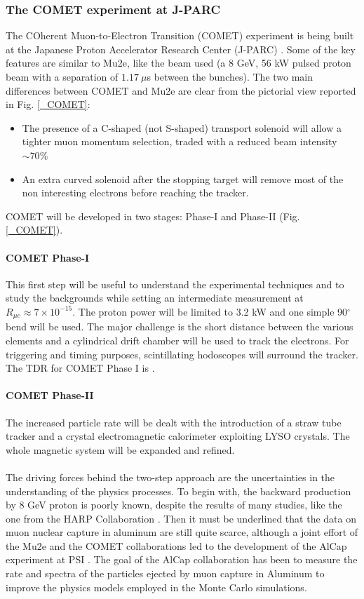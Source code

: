 \documentclass[12pt,a4paper,openright, oneside, titlepage]{book} %
\begin{document}
\subsubsection{The COMET experiment at J-PARC}
The COherent Muon-to-Electron Transition (COMET) experiment is being built at the Japanese Proton Accelerator Research Center (J-PARC) \cite{COMET_I}. 
Some of the key features are similar to Mu2e, like the beam used (a 8 GeV, 56 kW pulsed proton beam with a separation of $1.17\ \mu$s between the bunches). 
The two main differences between COMET and Mu2e are clear from the pictorial view reported in Fig. \ref{_COMET}:
\begin{itemize}
\item The presence of a C-shaped (not S-shaped) transport solenoid will allow a tighter muon momentum selection, traded with a reduced beam intensity $\sim 70\%$
\item An extra curved solenoid after the stopping target will remove most of the non interesting electrons before reaching the tracker.
\end{itemize}
COMET will be developed in two stages: Phase-I and Phase-II (Fig. \ref{_COMET}).
\paragraph{COMET Phase-I}
This first step will be useful to understand the experimental techniques and to study the backgrounds while setting an intermediate measurement at $R_{\mu e}\approx7\times10^{-15}$. 
The proton power will be limited to 3.2 kW and one simple 90$^\circ$ bend will be used. 
The major challenge is the short distance between the various elements and a cylindrical drift chamber will be used to track the electrons. For triggering and timing purposes, scintillating hodoscopes will surround the tracker. 
The TDR for COMET Phase I is \cite{COMET_I}.
\paragraph{COMET Phase-II}
The increased particle rate will be dealt with the introduction of a straw tube tracker and a crystal electromagnetic calorimeter exploiting LYSO crystals. 
The whole magnetic system will be expanded and refined.\\ \\
The driving forces behind the two-step approach are the uncertainties in the understanding of the physics processes. 
To begin with, the backward production by 8 GeV proton is poorly known, despite the results of many studies, like the one from the HARP Collaboration \cite{HARP}.
Then it must be underlined that the data on muon nuclear capture in aluminum are still quite scarce, although a joint effort of the Mu2e and the COMET collaborations led to the development of the AlCap experiment at PSI \cite{Edmonds:2015}\cite{AlCap:2015}\cite{AlCap:2018}. 
The goal of the AlCap collaboration has been to measure the rate and spectra of the particles ejected by muon capture in Aluminum to improve the physics models employed in the Monte Carlo simulations.
\end{document}

